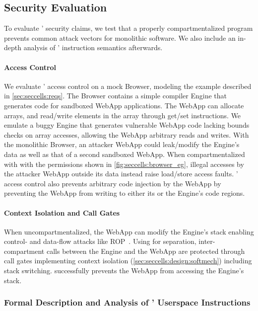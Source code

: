 \subsection{Security Evaluation}
\label{sec:seccells:evaluation:sec}

To evaluate \seccells' security claims, we test that a properly 
compartmentalized \seccells program prevents common attack vectors
for monolithic software.
We also include an in-depth analysis of \seccells' instruction semantics
afterwards.

\paragraph{Access Control}
We evaluate \seccells' access control on a mock Browser,
modeling the example described in \autoref{sec:seccells:reqs}.
The Browser contains a simple compiler Engine that generates code for
sandboxed WebApp applications.
The WebApp can allocate arrays, and read/write elements in the array through
get/set instructions.
We emulate a buggy Engine that generates vulnerable WebApp code lacking bounds 
checks on array accesses, allowing the WebApp arbitrary reads and writes.
With the monolithic Browser, an attacker WebApp could leak/modify the
Engine's data as well as that of a second sandboxed WebApp.
When compartmentalized with \seccells with the permissions shown in 
\autoref{fig:seccells:browser_eg}, illegal accesses by the attacker WebApp outside its
data \cell instead raise load/store access faults.
\seccells' access control also prevents arbitrary code injection by the WebApp
by preventing the WebApp from writing to either its or the Engine's code regions.

\paragraph{Context Isolation and Call Gates}
When uncompartmentalized, the WebApp can modify the Engine's stack enabling
control- and data-flow attacks like ROP~\cite{Shacham07}.
Using \seccells for separation, inter-compartment calls between the 
Engine and the WebApp are protected through call gates 
implementing context isolation (\autoref{sec:seccells:design:softmech}) including
stack switching.
\seccells successfully prevents the WebApp from accessing the Engine's stack.

\subsubsection{Formal Description and Analysis of \seccells' 
Userspace Instructions}

